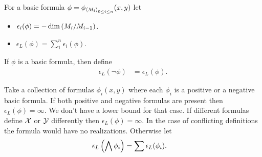 \documentclass{amsart}
\begin{document}
\begin{Definition} 
  For a basic formula $\phi = \phi_{\left\langle M_i \right\rangle_{0 \leq i \leq n}}(x, y)$ let
  \begin{itemize}
  \item $\epsilon_i(\phi) = -\dim \left(M_i/M_{i-1}\right)$.
  \item $\epsilon_L(\phi) = \sum_1^{n} \epsilon_i(\phi)$.
  \end{itemize}
\end{Definition}

\begin{Definition}[Negation]
  If $\phi$ is a basic formula, then define
  \begin{align*}
    \epsilon_L(\neg \phi) &= \epsilon_L(\phi).
  \end{align*}
\end{Definition}

\begin{Definition}[Conjunction]
  Take a collection of formulas $\phi_i(x, y)$ where each $\phi_i$ is a positive or a negative basic formula.
  If both positive and negative formulas are present then $\epsilon_L(\phi) = \infty$.
  We don't have a lower bound for that case.
  If different formulas define $\mathcal X$ or $\mathcal Y$ differently then $\epsilon_L(\phi) = \infty$.
  In the case of conflicting definitions the formula would have no realizations.
  Otherwise let
  \begin{align*}
    \epsilon_L\left(\bigwedge \phi_i\right) &= \sum \epsilon_L(\phi_i).
  \end{align*}
\end{Definition}
\end{document}
